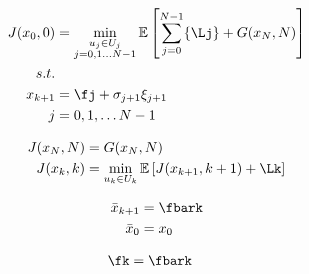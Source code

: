 \documentclass[varwidth]{standalone}
\providecommand{\Jzero}{J(x_0, 0)}
\providecommand{\Jk}{J(x_k, k)}
\providecommand{\JN}{J(x_N, N)}
\providecommand{\Jkp}{J(x_{k+1}, k+1)}
\providecommand{\GN}{G(x_N, N)}
\providecommand{\xkp}{x_{k+1}}
\providecommand{\xbarkp}{\bar{x}_{k+1}}
\providecommand{\noisejp}{\sigma_{j+1} \xi_{j+1}}
\begin{document}
\begin{minipage}{0.8\linewidth}

    \begin{align}
        \Jzero &= \min_{
            \substack{
                u_j \in U_j \\
                j = 0, 1 \dots N-1 \\
            }
        }
        \mathbb{E} \left[ \sum_{j=0}^{N-1} \{\Lj\} + \GN\right] \nonumber\\
        s.t. &{} \\
        \xkp &= \fj + \noisejp \nonumber\\
        j &= 0, 1, \dots N-1 \nonumber
    \end{align}

    \begin{align}
        \JN &= \GN  \\
        \Jk &= \min_{u_k \in U_k} \mathbb{E} \left[ 
            \Jkp + \Lk 
        \right]
    \end{align}

    \begin{align}
        \xbarkp &= \fbark \\
        \bar{x}_0 &= x_0 \nonumber
    \end{align}

    \begin{align}
        \fk &= \fbark
    \end{align}
\end{minipage}
\end{document}
